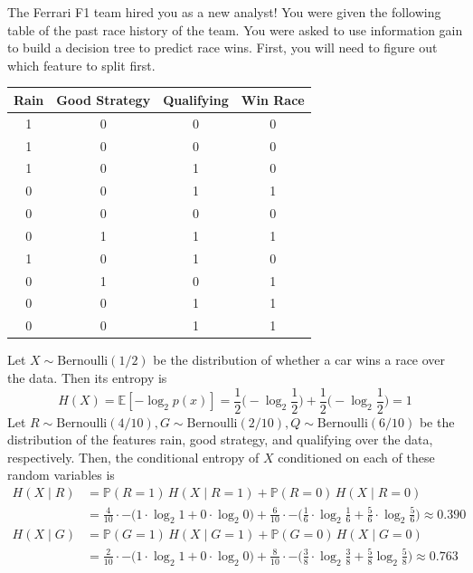 \documentclass{article}
\begin{document}
    \begin{example}
      The Ferrari F1 team hired you as a new analyst! You were given the following table of the past race history of the team. You were asked to use information gain to build a decision tree to predict race wins. First, you will need to figure out which feature to split first. 

      \begin{center}
      \begin{tabular}[c]{c|c|c||c}
      Rain & Good Strategy & Qualifying & Win Race \\ \hline
      1 & 0 & 0 & 0 \\
      1 & 0 & 0 & 0 \\
      1 & 0 & 1 & 0 \\
      0 & 0 & 1 & 1 \\
      0 & 0 & 0 & 0 \\
      0 & 1 & 1 & 1 \\
      1 & 0 & 1 & 0 \\
      0 & 1 & 0 & 1 \\
      0 & 0 & 1 & 1 \\
      0 & 0 & 1 & 1 \\
      \end{tabular}
      \end{center}
      Let $X \sim \mathrm{Bernoulli}(1/2)$ be the distribution of whether a car wins a race over the data. Then its entropy is 
      \[H(X) = \mathbb{E}[-\log_2 p(x)] = \frac{1}{2} \big( -\log_2 \frac{1}{2} \big) + \frac{1}{2} \big( -\log_2 \frac{1}{2} \big) = 1\]
      Let $R \sim \mathrm{Bernoulli}(4/10), G \sim \mathrm{Bernoulli}(2/10), Q \sim \mathrm{Bernoulli}(6/10)$ be the distribution of the features rain, good strategy, and qualifying over the data, respectively. Then, the conditional entropy of $X$ conditioned on each of these random variables is 
      \begin{align*}
          H(X \mid R) & = \mathbb{P}(R = 1)\, H(X \mid R = 1) + \mathbb{P}(R = 0) \, H(X \mid R = 0) \\
          & = \frac{4}{10} \cdot - \big( 1 \cdot \log_2 1 + 0 \cdot \log_2 0 \big) + \frac{6}{10} \cdot - \big( \frac{1}{6} \cdot \log_2 \frac{1}{6} + \frac{5}{6} \cdot \log_2 \frac{5}{6} \big) \approx 0.390 \\
          H(X \mid G) & =  \mathbb{P}(G = 1)\, H(X \mid G = 1) + \mathbb{P}(G = 0) \, H(X \mid G = 0) \\
          & = \frac{2}{10} \cdot - \big( 1 \cdot \log_2 1 + 0 \cdot \log_2 0 \big) + \frac{8}{10} \cdot - \big( \frac{3}{8} \cdot \log_2 \frac{3}{8} + \frac{5}{8} \log_2 \frac{5}{8} \big) \approx 0.763\\

\end{align*}
\end{example}
\end{document}
